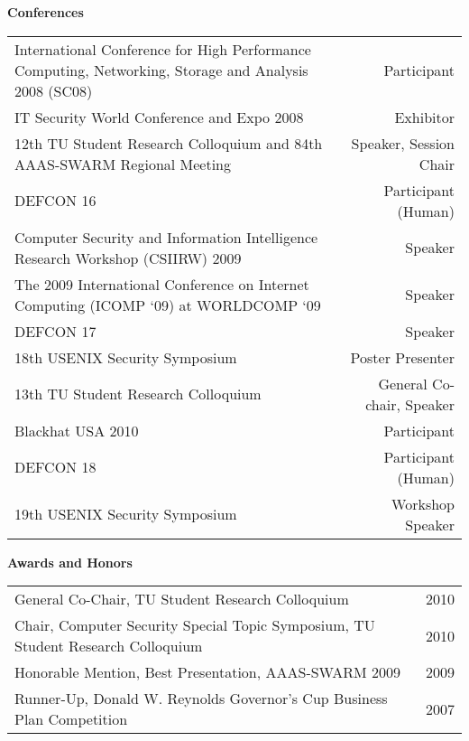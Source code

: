 \documentclass[letterpaper,11pt]{article}
\newcommand{\resheading}[1]{{\large \colorbox{mygrey}{\begin{minipage}{\textwidth}{\textbf{#1 \vphantom{p\^{E}}}}\end{minipage}}}}
\begin{document}
\resheading{Conferences}
\begin{center}
	\begin{tabular*}{6.5in}{m{5in}@{\extracolsep{\fill}}r}
		International Conference for High Performance Computing, Networking, Storage and Analysis 2008 (SC08) & Participant \\
		IT Security World Conference and Expo 2008 & Exhibitor \\
		12th TU Student Research Colloquium and 84th AAAS-SWARM Regional Meeting & Speaker, Session Chair \\
		DEFCON 16 & Participant (Human) \\
		Computer Security and Information Intelligence Research Workshop (CSIIRW) 2009 & Speaker \\
		The 2009 International Conference on Internet Computing (ICOMP `09) at WORLDCOMP `09 & Speaker \\
		DEFCON 17 & Speaker \\
		18th USENIX Security Symposium & Poster Presenter \\
		13th TU Student Research Colloquium & General Co-chair, Speaker \\
		Blackhat USA 2010 & Participant \\
		DEFCON 18 & Participant (Human) \\
		19th USENIX Security Symposium & Workshop Speaker \\
	\end{tabular*}
\end{center}

\resheading{Awards and Honors}
\begin{center}
	\begin{tabular*}{6.5in}{l@{\extracolsep{\fill}}r}
		General Co-Chair, TU Student Research Colloquium & 2010 \\
		Chair, Computer Security Special Topic Symposium, TU Student Research Colloquium & 2010 \\
		Honorable Mention, Best Presentation, AAAS-SWARM 2009 & 2009 \\
		Runner-Up, Donald W. Reynolds Governor's Cup Business Plan Competition & 2007\\
	\end{tabular*}
\end{center}
\end{document}
